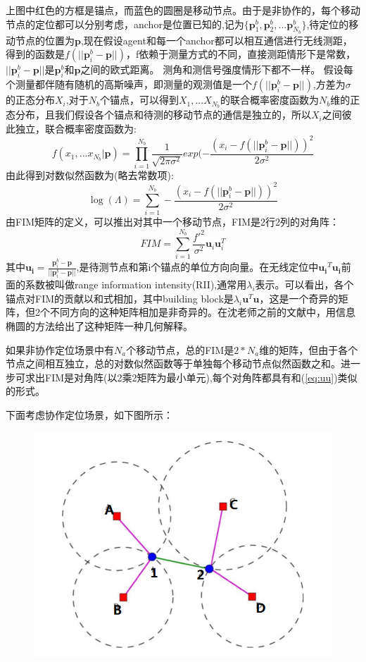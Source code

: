 \documentclass[12pt]{article}
\begin{document}
上图中红色的方框是锚点，而蓝色的圆圈是移动节点。由于是非协作的，每个移动节点的定位都可以分别考虑，anchor是位置已知的,记为$\{\bm{p}^b_1,\bm{p}^b_2,...\bm{p}^b_{N_b}\}$,待定位的移动节点的位置为$\bm{p}$,现在假设agent和每一个anchor都可以相互通信进行无线测距，得到的函数是$
f(||\bm{p}^b_i-\bm{p}||)$，f依赖于测量方式的不同，直接测距情形下是常数，$||\bm{p}^b_i-\bm{p}||$是$\bm{p}^b_i$和$\bm{p}$之间的欧式距离。
测角和测信号强度情形下都不一样。
假设每个测量都伴随有随机的高斯噪声，即测量的观测值是一个$f(||\bm{p}^b_i-\bm{p}||)$,方差为$\sigma$的正态分布$X_i$,对于$N_b$个锚点，可以得到$X_1,...X_{N_b}$的联合概率密度函数为$N_b$维的正态分布，且我们假设各个锚点和待测的移动节点的通信是独立的，所以$X_i$之间彼此独立，联合概率密度函数为:
\begin{equation}
f(x_1,...x_{N_b}|\bm{p})=\prod_{i=1}^{N_b}\frac{1}{\sqrt{2\pi\sigma^2}}exp(-\frac{(x_i-f(||\bm{p}^b_i-\bm{p}||))^2}{2\sigma^2}
\end{equation}
由此得到对数似然函数为(略去常数项):
\begin{equation}
\log(\Lambda)=\displaystyle\sum_{i=1}^{N_b} -\frac{(x_i-f(||\bm{p}^b_i-\bm{p}||))^2}{2\sigma^2}
\end{equation}
由FIM矩阵的定义，可以推出对其中一个移动节点，FIM是2行2列的对角阵：
\begin{equation}\label{eq:uu}
FIM=\displaystyle\sum_{i=1}^{N_b}\frac{f'^2}{\sigma^2}\bm{u}_i\bm{u}_i^T
\end{equation}
其中$\bm{u_i}=\frac{\bm{p}^b_i-\bm{p}}{||\bm{p}^b_i-\bm{p}||}$,是待测节点和第i个锚点的单位方向向量。在无线定位中$\bm{u_i}^T\bm{u_i}$前面的系数被叫做range information intensity(RII),通常用$\lambda_i$表示。可以看出，各个锚点对FIM的贡献以和式相加，其中building block是$\lambda_i \bm{u}^T\bm{u}$，这是一个奇异的矩阵，但2个不同方向的这种矩阵相加是非奇异的。在沈老师之前的文献中，用信息椭圆的方法给出了这种矩阵一种几何解释。

如果非协作定位场景中有$N_a$个移动节点，总的FIM是$2*N_a$维的矩阵，但由于各个节点之间相互独立，总的对数似然函数等于单独每个移动节点似然函数之和。进一步可求出FIM是对角阵(以2乘2矩阵为最小单元),每个对角阵都具有和(\ref{eq:uu})类似的形式。

下面考虑协作定位场景，如下图所示：
\begin{figure}[!ht]
\includegraphics[width=\textwidth]{003.png}
\end{figure}
\end{document}
